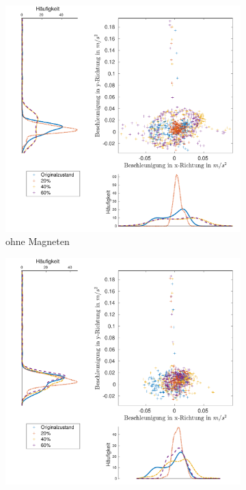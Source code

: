 \begin{landscape}
	\begin{figure}[htb]
		\centering
			\begin{subfigure}[c]{.45\linewidth}
				\centering
				\includegraphics[width=\linewidth]{Bilder/Beschleunigung_Grund_20_40_60_ohneM.pdf}
				\caption{ohne Magneten}
				\vspace{5pt}
			\end{subfigure}
			\hfill
			\begin{subfigure}[c]{.45\linewidth}
				\centering
				\includegraphics[width=\linewidth]{Bilder/Beschleunigung_Grund_20_40_60_mitM.pdf}

\end{subfigure}
\end{figure}
\end{landscape}

